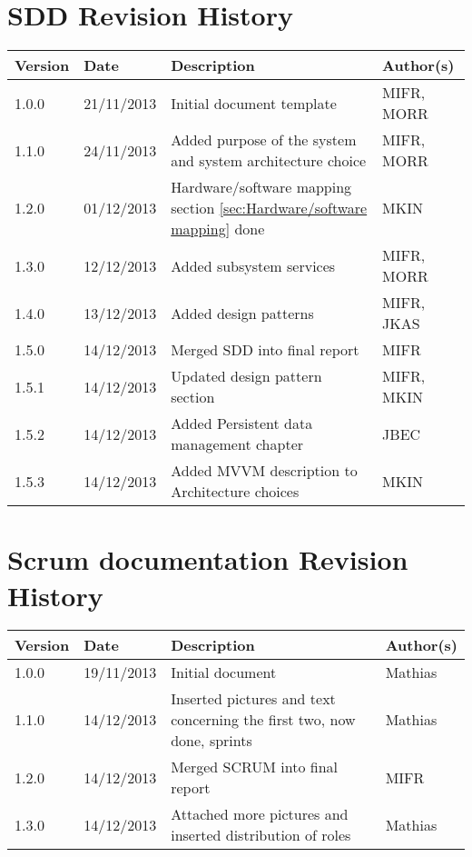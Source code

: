 \section{SDD Revision History}
\begin{center}
    \begin{tabular}{ | l | l | p{6cm} | p{4cm} |}
    \hline
    Version & Date & Description & Author(s) 
    \\ \hline
    1.0.0 & 21/11/2013 & Initial document template & MIFR, MORR
    \\ \hline
    1.1.0 & 24/11/2013 & Added purpose of the system and system architecture choice & MIFR, MORR
    \\ \hline
    1.2.0 & 01/12/2013 & Hardware/software mapping section \ref{sec:Hardware/software mapping} done & MKIN
    \\ \hline
    1.3.0 & 12/12/2013 & Added subsystem services & MIFR, MORR
    \\ \hline
    1.4.0 & 13/12/2013 & Added design patterns & MIFR, JKAS
    \\ \hline
    1.5.0 & 14/12/2013 & Merged SDD into final report & MIFR
    \\ \hline
    1.5.1 & 14/12/2013 & Updated design pattern section & MIFR, MKIN
    \\ \hline
    1.5.2 & 14/12/2013 & Added Persistent data management chapter & JBEC
    \\ \hline
    1.5.3 & 14/12/2013 & Added MVVM description to Architecture choices & MKIN
    \\ \hline
    \end{tabular}
\end{center}

\section{Scrum documentation Revision History}
\begin{center}
    \begin{tabular}{ | l | l | p{6cm} | p{4cm} |}
    \hline
    Version & Date & Description & Author(s) 
    \\ \hline
    1.0.0 & 19/11/2013 & Initial document & Mathias
    \\ \hline
    1.1.0 & 14/12/2013 & Inserted pictures and text concerning the first two, now done, sprints & Mathias
    \\ \hline
    1.2.0 & 14/12/2013 & Merged SCRUM into final report & MIFR
    \\ \hline
    1.3.0 & 14/12/2013 & Attached more pictures and inserted distribution of roles & Mathias
    \\ \hline
    \end{tabular}
\end{center}
